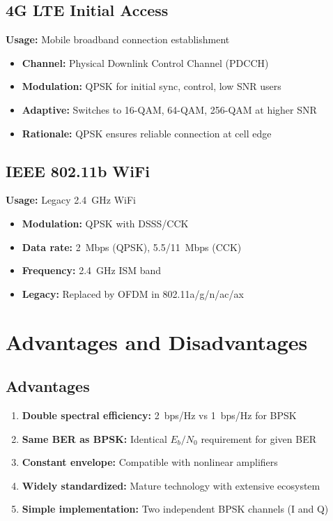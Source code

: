 \subsection{4G LTE Initial Access}

\textbf{Usage:} Mobile broadband connection establishment
\begin{itemize}
\item \textbf{Channel:} Physical Downlink Control Channel (PDCCH)
\item \textbf{Modulation:} QPSK for initial sync, control, low SNR users
\item \textbf{Adaptive:} Switches to 16-QAM, 64-QAM, 256-QAM at higher SNR
\item \textbf{Rationale:} QPSK ensures reliable connection at cell edge
\end{itemize}

\subsection{IEEE 802.11b WiFi}

\textbf{Usage:} Legacy 2.4~GHz WiFi
\begin{itemize}
\item \textbf{Modulation:} QPSK with DSSS/CCK
\item \textbf{Data rate:} 2~Mbps (QPSK), 5.5/11~Mbps (CCK)
\item \textbf{Frequency:} 2.4~GHz ISM band
\item \textbf{Legacy:} Replaced by OFDM in 802.11a/g/n/ac/ax
\end{itemize}

\section{Advantages and Disadvantages}

\subsection*{Advantages}

\begin{enumerate}
\item \textbf{Double spectral efficiency:} 2~bps/Hz vs 1~bps/Hz for BPSK
\item \textbf{Same BER as BPSK:} Identical $E_b/N_0$ requirement for given BER
\item \textbf{Constant envelope:} Compatible with nonlinear amplifiers
\item \textbf{Widely standardized:} Mature technology with extensive ecosystem
\item \textbf{Simple implementation:} Two independent BPSK channels (I and Q)
\end{enumerate}

